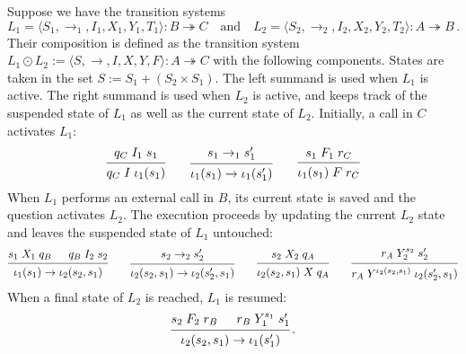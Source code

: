 \documentclass[acmsmall,screen,review,anonymous]{acmart}
\begin{document}
\begin{definition} \label{def:lcomp} %
Suppose we have the transition systems
\[
  L_1 = \langle S_1, {\rightarrow_1}, I_1, X_1, Y_1, T_1 \rangle
    : B \twoheadrightarrow C
  \quad \text{and} \quad
  L_2 = \langle S_2, {\rightarrow_2}, I_2, X_2, Y_2, T_2 \rangle
    : A \twoheadrightarrow B
  \,.
\]
Their composition is defined as the transition system
$
  L_1 \odot L_2 :=
  \langle S, {\rightarrow}, I, X, Y, F \rangle
  : A \twoheadrightarrow C
$
with the following components.
States are taken in the set
$
    S := S_1 + (S_2 \times S_1)
$.
The left summand is used when $L_1$ is active.
The right summand is used when $L_2$ is active,
and keeps track of the suspended state of $L_1$
as well as the current state of $L_2$.
Initially, a call in $C$ activates $L_1$:
\[
  \begin{prooftree}
    \hypo{q_C \mathrel{I_1} s_1}
    \infer1{q_C \mathrel{I} \iota_1(s_1)}
  \end{prooftree}
  \qquad
  \begin{prooftree}
    \hypo{s_1 \rightarrow_1 s_1'}
    \infer1{\iota_1(s_1) \rightarrow \iota_1(s_1')}
  \end{prooftree}
  \qquad
  \begin{prooftree}
    \hypo{s_1 \mathrel{F_1} r_C}
    \infer1{\iota_1(s_1) \mathrel{F} r_C}
  \end{prooftree}
\]
When $L_1$ performs an external call in $B$,
its current state is saved and
the question activates $L_2$.
The execution proceeds
by updating the current $L_2$ state
and leaves the suspended state of $L_1$ untouched:
\[
  \begin{prooftree}
    \hypo{s_1 \mathrel{X_1} q_B}
    \hypo{q_B \mathrel{I_2} s_2}
    \infer2{\iota_1(s_1) \rightarrow \iota_2(s_2, s_1)}
  \end{prooftree}
  \qquad
  \begin{prooftree}
    \hypo{s_2 \rightarrow_2 s_2'}
    \infer1{\iota_2(s_2, s_1) \rightarrow \iota_2(s_2', s_1)}
  \end{prooftree}
  \qquad
  \begin{prooftree}
    \hypo{s_2 \mathrel{X_2} q_A}
    \infer1{\iota_2(s_2, s_1) \mathrel{X} q_A}
  \end{prooftree}
  \qquad
  \begin{prooftree}
    \hypo{r_A \mathrel{Y_2^{s_2}} s_2'}
    \infer1{r_A \mathrel{Y^{\iota_2(s_2, s_1)}} \iota_2(s_2', s_1)}
  \end{prooftree}
\]
When a final state of $L_2$ is reached,
$L_1$ is resumed:
\[
  \begin{prooftree}
    \hypo{s_2 \mathrel{F_2} r_B}
    \hypo{r_B \mathrel{Y_1^{s_1}} s_1'}
    \infer2{\iota_2(s_2, s_1) \rightarrow \iota_1(s_1')}
  \end{prooftree}
  \,.
\]
\end{definition}
\end{document}
